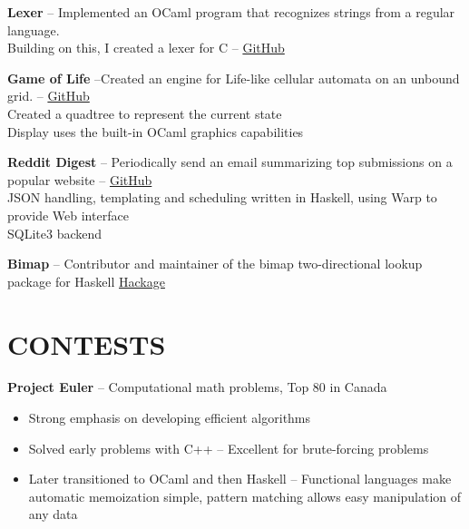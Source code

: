 \documentclass{res}
\begin{document}
\begin{resume}
    {\bf Lexer} -- Implemented an OCaml program that recognizes strings from a regular language.\\
    \hspace*{10mm}  Building on this, I created a lexer for C --
    \href{https://www.github.com/joelwilliamson/ndfa}{GitHub}
    \vspace{-3mm}

    {\bf Game of Life} --Created an engine for Life-like cellular automata on an unbound grid. --
    \href{https://www.github.com/joelwilliamson/life}{GitHub} \\
    \hspace*{10mm}  Created a quadtree to represent the current state \\
    \hspace*{10mm}  Display uses the built-in OCaml graphics capabilities
    \vspace{-3mm}

    {\bf Reddit Digest} -- Periodically send an email summarizing top submissions on a popular website --
    \href{https://github.com/joelwilliamson/reddit-digest}{GitHub}\\
    \hspace*{10mm}  JSON handling, templating and scheduling written in Haskell, using Warp to provide Web interface \\
    \hspace*{10mm}  SQLite3 backend
    \vspace{-3mm}

    {\bf Bimap} -- Contributor and maintainer of the bimap two-directional lookup package for Haskell
    \href{http://hackage.haskell.org/package/bimap-0.3.0}{Hackage}
    \pagebreak 
\section{CONTESTS}
\vspace{3mm}
        {\bf Project Euler} -- Computational math problems, Top 80 in Canada
        \begin{itemize}
          \item Strong emphasis on developing efficient algorithms
          \item Solved early problems with C++ -- Excellent for brute-forcing problems
          \item Later transitioned to OCaml and then Haskell --
            Functional languages make automatic memoization simple, pattern matching allows easy manipulation of any data
        \end{itemize}


\end{resume}
\end{document}
